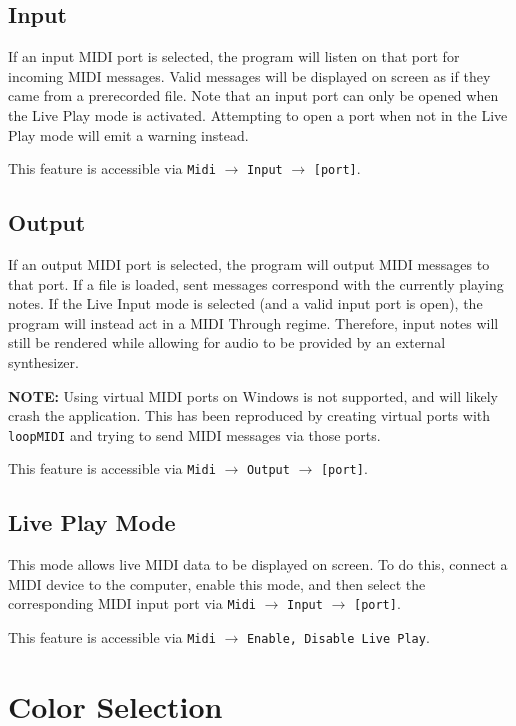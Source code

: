 \documentclass[english]{article}
\providecommand{\mi}[1]{\texttt{#1}}
\begin{document}
\subsection{Input}

If an input MIDI port is selected, the program will listen on that port for incoming MIDI messages. Valid messages will
be displayed on screen as if they came from a prerecorded file. Note that an input port can only be opened when the
Live Play mode is activated. Attempting to open a port when not in the Live Play mode will emit a warning instead.

This feature is accessible via 
\mi{Midi} $\rightarrow$ \mi{Input} $\rightarrow$ \mi{[port]}.

\subsection{Output}
\label{subsec:output}

If an output MIDI port is selected, the program will output MIDI messages to that port. If a file is loaded, sent messages
correspond with the currently playing notes. If the Live Input mode is selected (and a valid input port is open), the program
will instead act in a MIDI Through regime. Therefore, input notes will still 
be rendered while allowing for audio to be provided by an external synthesizer.

\textbf{NOTE:} Using virtual MIDI ports on Windows is not supported, and will likely crash the application. This has been
reproduced by creating virtual ports with \mi{loopMIDI} and trying to send MIDI messages via those ports.

This feature is accessible via 
\mi{Midi} $\rightarrow$ \mi{Output} $\rightarrow$ \mi{[port]}.

\subsection{Live Play Mode}

This mode allows live MIDI data to be displayed on screen. To do this, connect a MIDI device to the computer, enable
this mode, and then select the corresponding MIDI input port via 
\mi{Midi} $\rightarrow$ \mi{Input} $\rightarrow$ \mi{[port]}.

This feature is accessible via 
\mi{Midi} $\rightarrow$ \mi{{Enable, Disable} Live Play}.

\section{Color Selection}
\end{document}
